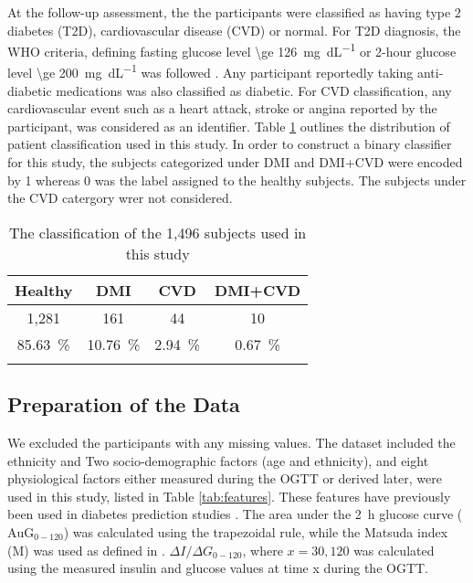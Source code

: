 \documentclass[journal,comsoc]{IEEEtran}
\begin{document}
At the follow-up assessment, the the participants were classified as having type 2 diabetes (T2D), cardiovascular disease (CVD) or normal. For T2D diagnosis, the WHO criteria, defining fasting glucose level \SI[round-mode = off,group-separator = {,}]{\ge 126}{\milli\gram\per\deci\liter} or 2-hour glucose level \SI[round-mode = off,group-separator = {,}]{\ge 200}{\milli\gram\per\deci\liter} was followed \cite{wei_effects_1998}. Any participant reportedly taking anti-diabetic medications was also classified as diabetic. For CVD classification, any cardiovascular event such as a heart attack, stroke or angina reported by the participant, was considered as an identifier. Table \ref{tab:patients} outlines the distribution of patient classification used in this study. In order to construct a binary classifier for this study, the subjects categorized under DMI and DMI+CVD were encoded by 1 whereas 0 was the label assigned to the healthy subjects. The subjects under the CVD catergory wrer not considered.
%
\begin{table}[!h]
\centering
\begin{tabular}{c c c c}
\toprule
Healthy &  DMI & CVD & DMI+CVD\\
\midrule \midrule
1,281 & 161 & 44 & 10\\
\SI{85.63}{\percent} & \SI{10.76}{\percent} & \SI[round-precision=3]{2.94}{\percent} & \SI[round-precision=2]{0.67}{\percent} \\
\bottomrule \\
\end{tabular}
\caption{The classification of the 1,496 subjects used in this study}
\label{tab:patients}
\end{table}


\subsection{Preparation of the Data}
%
We excluded the participants with any missing values. The dataset included the ethnicity and Two socio-demographic factors (age and ethnicity), and eight physiological factors either measured during the OGTT or derived later, were used in this study, listed in Table \ref{tab:features}. These features have previously been used in diabetes prediction studies \cite{abdul-ghani_what_2007,abdul-ghani_plasma_2009}. The area under the \SI{2}{\hour} glucose curve ($\textrm{AuG}_{0-120}$) was calculated using the trapezoidal rule, while the Matsuda index (M) was used as defined in \cite{Matsuda1462}. \( {\Delta I}/{\Delta G}_{0-120} \), where $x = 30, 120$ was calculated using the measured insulin and glucose values at time x during the OGTT.
\end{document}
